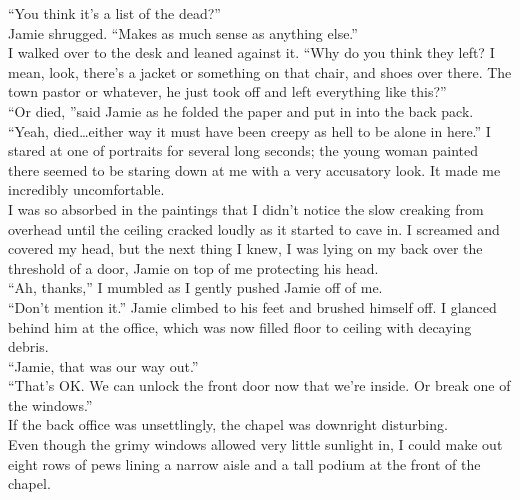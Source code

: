 \documentclass[a5paper]{scrartcl}
\begin{document}
\enquote{You think it's a list of the dead?}\\


Jamie shrugged. \enquote{Makes as much sense as anything else.}\\


I walked over to the desk and leaned against it. \enquote{Why do you think they left? I mean, look, there's a jacket or something on that chair, and shoes over there. The town pastor or whatever, he just took off and left everything like this?}\\


\enquote{Or died, }said Jamie as he folded the paper and put in into the back pack. \\


\enquote{Yeah, died\dots either way it must have been creepy as hell to be alone in here.} I stared at one of portraits for several long seconds; the young woman painted there seemed to be staring down at me with a very accusatory look. It made me incredibly uncomfortable. \\


I was so absorbed in the paintings that I didn't notice the slow creaking from overhead until the ceiling cracked loudly as it started to cave in. I screamed and covered my head, but the next thing I knew, I was lying on my back over the threshold of a door, Jamie on top of me protecting his head. \\


\enquote{Ah, thanks,} I mumbled as I gently pushed Jamie off of me. \\

\enquote{Don't mention it.} Jamie climbed to his feet and brushed himself off.
I glanced behind him at the office, which was now filled floor to ceiling with decaying debris.\\

\enquote{Jamie, that was our way out.} \\


\enquote{That's OK. We can unlock the front door now that we're inside. Or break one of the windows.}\\


If the back office was unsettlingly, the chapel was downright disturbing.\\


Even though the grimy windows allowed very little sunlight in, I could make out eight rows of pews lining a narrow aisle and a tall podium at the front of the chapel.\\
\end{document}
